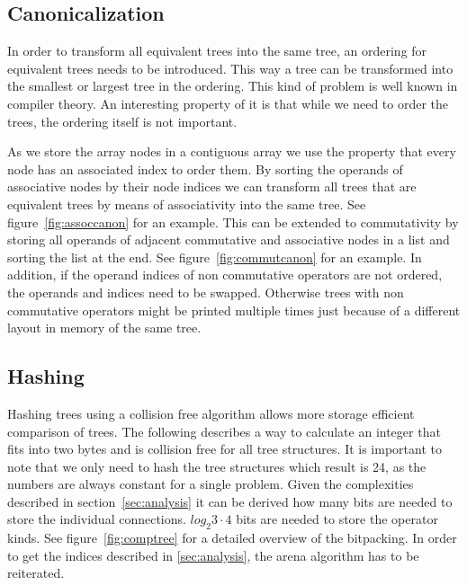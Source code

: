 \documentclass[11pt,a4paper]{article}
\begin{document}
\subsection{Canonicalization}

In order to transform all equivalent trees into the same tree, an
ordering for equivalent trees needs to be introduced.
This way a tree can be transformed into the smallest or largest tree
in the ordering.
This kind of problem is well known in compiler theory.
An interesting property of it is that while we need to order the
trees, the ordering itself is not important.

As we store the array nodes in a contiguous array we use the property
that every node has an associated index to order them.
By sorting the operands of associative nodes by their node indices we
can transform all trees that are equivalent trees by means of
associativity into the same tree. See figure~\ref{fig:assoccanon} for
an example.
This can be extended to commutativity by storing all operands of
adjacent commutative and associative nodes in a list and sorting the
list at the end.
See figure~\ref{fig:commutcanon} for an example.
In addition, if the operand indices of non commutative operators are
not ordered, the operands and indices need to be swapped.
Otherwise trees with non commutative operators might be printed
multiple times just because of a different layout in memory of the
same tree.

\subsection{Hashing}

Hashing trees using a collision free algorithm allows more storage
efficient comparison of trees.
The following describes a way to calculate an integer that fits into
two bytes and is collision free for all tree structures.
It is important to note that we only need to hash the tree structures
which result is 24, as the numbers are always constant for a single
problem.
Given the complexities described in section~\ref{sec:analysis} it can
be derived how many bits are needed to store the individual
connections.
$log_2{3 \cdot 4}$ bits are needed to store the operator kinds.
See figure~\ref{fig:comptree} for a detailed overview of the
bitpacking.
In order to get the indices described in \ref{sec:analysis}, the arena
algorithm has to be reiterated.



\end{document}
